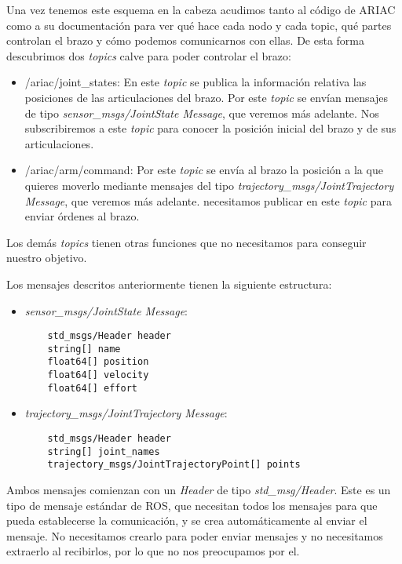 Una vez tenemos este esquema en la cabeza acudimos tanto al código de ARIAC como a su documentación para ver qué hace cada nodo y cada topic, qué partes controlan el brazo y cómo podemos comunicarnos con ellas. De esta forma descubrimos dos \textit{topics} calve para poder controlar el brazo:
\begin{itemize}
	\item /ariac/joint\_states: En este \textit{topic} se publica la información relativa las posiciones de las articulaciones del brazo. Por este \textit{topic} se envían mensajes de tipo \textit{sensor\_msgs/JointState Message}, que veremos más adelante. Nos subscribiremos a este \textit{topic} para conocer la posición inicial del brazo y de sus articulaciones.
	
	\item /ariac/arm/command: Por este \textit{topic} se envía al brazo la posición a la que quieres moverlo mediante mensajes del tipo \textit{trajectory\_msgs/JointTrajectory Message}, que veremos más adelante. necesitamos publicar en este \textit{topic} para enviar órdenes al brazo.
	
\end{itemize}

Los demás \textit{topics} tienen otras funciones que no necesitamos para conseguir nuestro objetivo.

Los mensajes descritos anteriormente tienen la siguiente estructura:
\begin{itemize}
	\item \textit{sensor\_msgs/JointState Message}:
	\begin{lstlisting}
	std_msgs/Header header
	string[] name
	float64[] position
	float64[] velocity
	float64[] effort
	\end{lstlisting}
	\item \textit{trajectory\_msgs/JointTrajectory Message}:
	\begin{lstlisting}
	std_msgs/Header header
	string[] joint_names
	trajectory_msgs/JointTrajectoryPoint[] points
	\end{lstlisting}
\end{itemize}

Ambos mensajes comienzan con un \textit{Header} de tipo \textit{std\_msg/Header}. Este es un tipo de mensaje estándar de ROS, que necesitan todos los mensajes para que pueda establecerse la comunicación, y se crea automáticamente al enviar el mensaje. No necesitamos crearlo para poder enviar mensajes y no necesitamos extraerlo al recibirlos, por lo que no nos preocupamos por el.

